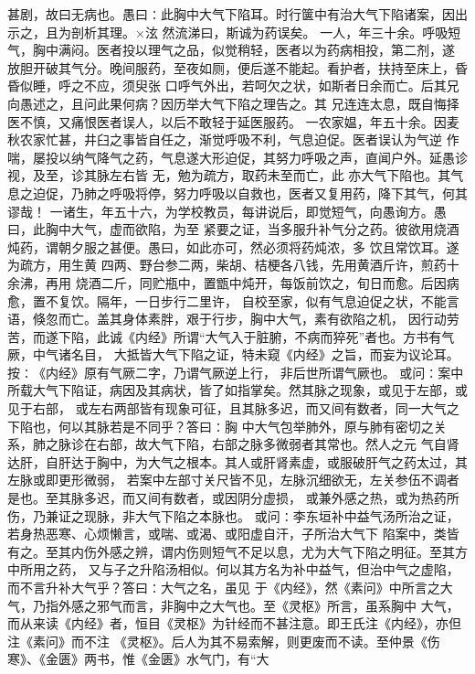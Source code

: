 \documentclass[a4paper,12pt,UTF8,twoside]{ctexbook}
\begin{document}
甚剧，故曰无病也。愚曰∶此胸中大气下陷耳。时行箧中有治大气下陷诸案，因出示之，且为剖析其理。×泫 
然流涕曰，斯诚为药误矣。 
一人，年三十余。呼吸短气，胸中满闷。医者投以理气之品，似觉稍轻，医者以为药病相投，第二剂，遂 
放胆开破其气分。晚间服药，至夜如厕，便后遂不能起。看护者，扶持至床上，昏昏似睡，呼之不应，须臾张 
口呼气外出，若呵欠之状，如斯者日余而亡。后其兄向愚述之，且问此果何病？因历举大气下陷之理告之。其 
兄连连太息，既自悔择医不慎，又痛恨医者误人，以后不敢轻于延医服药。 
一农家媪，年五十余。因麦秋农家忙甚，井臼之事皆自任之，渐觉呼吸不利，气息迫促。医者误认为气逆 
作喘，屡投以纳气降气之药，气息遂大形迫促，其努力呼吸之声，直闻户外。延愚诊视，及至，诊其脉左右皆 
无，勉为疏方，取药未至而亡，此 
亦大气下陷也。其气息之迫促，乃肺之呼吸将停，努力呼吸以自救也，医者又复用药，降下其气，何其谬哉！ 
一诸生，年五十六，为学校教员，每讲说后，即觉短气，向愚询方。愚曰，此胸中大气，虚而欲陷，为至 
紧要之证，当多服升补气分之药。彼欲用烧酒炖药，谓朝夕服之甚便。愚曰，如此亦可，然必须将药炖浓，多 
饮且常饮耳。遂为疏方，用生黄 四两、野台参二两，柴胡、桔梗各八钱，先用黄酒斤许，煎药十余沸，再用 
烧酒二斤，同贮瓶中，置甑中炖开，每饭前饮之，旬日而愈。后因病愈，置不复饮。隔年，一日步行二里许， 
自校至家，似有气息迫促之状，不能言语，倏忽而亡。盖其身体素胖，艰于行步，胸中大气，素有欲陷之机， 
因行动劳苦，而遂下陷，此诚《内经》所谓“大气入于脏腑，不病而猝死”者也。方书有气厥，中气诸名目， 
大抵皆大气下陷之证，特未窥《内经》之旨，而妄为议论耳。 
按∶《内经》原有气厥二字，乃谓气厥逆上行， 
非后世所谓气厥也。 
或问∶案中所载大气下陷证，病因及其病状，皆了如指掌矣。然其脉之现象，或见于左部，或见于右部， 
或左右两部皆有现象可征，且其脉多迟，而又间有数者，同一大气之下陷也，何以其脉若是不同乎？答曰∶胸 
中大气包举肺外，原与肺有密切之关系，肺之脉诊在右部，故大气下陷，右部之脉多微弱者其常也。然人之元 
气自肾达肝，自肝达于胸中，为大气之根本。其人或肝肾素虚，或服破肝气之药太过，其左脉或即更形微弱， 
若案中左部寸关尺皆不见，左脉沉细欲无，左关参伍不调者是也。至其脉多迟，而又间有数者，或因阴分虚损， 
或兼外感之热，或为热药所伤，乃兼证之现脉，非大气下陷之本脉也。 
或问∶李东垣补中益气汤所治之证，若身热恶寒、心烦懒言，或喘、或渴、或阳虚自汗，子所治大气下 
陷案中，类皆有之。至其内伤外感之辨，谓内伤则短气不足以息，尤为大气下陷之明征。至其方中所用之药， 
又与子之升陷汤相似。何以其方名为补中益气，但治中气之虚陷，而不言升补大气乎？答曰∶大气之名，虽见 
于《内经》，然《素问》中所言之大气，乃指外感之邪气而言，非胸中之大气也。至《灵枢》所言，虽系胸中 
大气，而从来读《内经》者，恒目《灵枢》为针经而不甚注意。即王氏注《内经》，亦但注《素问》而不注 
《灵枢》。后人为其不易索解，则更废而不读。至仲景《伤寒》、《金匮》两书，惟《金匮》水气门，有“大 
\end{document}
